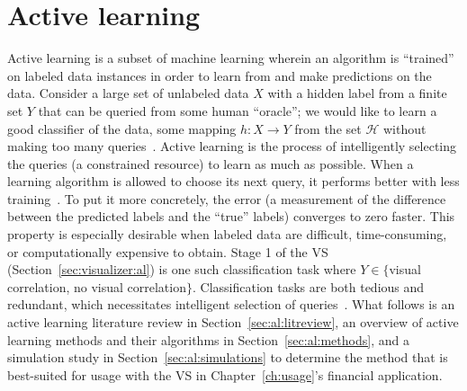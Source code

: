\chapter{Active learning \label{ch:al}}

Active learning is a subset of machine learning wherein an algorithm is 
``trained'' on labeled data instances in order to learn from and make 
predictions on the data.  Consider a large set of unlabeled data $X$ with a 
hidden label from a finite set $Y$ that can be queried from some human 
``oracle''; we would like to learn a good classifier of the data, some mapping 
$h: X \rightarrow Y$ from the set $\mathcal{H}$ without making too many 
queries~\cite{dasgupta2011}. Active learning is the process of intelligently 
selecting the queries (a constrained resource) to learn as much as possible. 
When a learning algorithm is allowed to choose its next query, it performs 
better with less training~\cite{settles2010}. To put it more concretely, the 
error (a measurement of the difference between the predicted labels and the 
``true'' labels) converges to zero faster. This property is especially 
desirable when labeled data are difficult, time-consuming, or computationally 
expensive to obtain. Stage 1 of the VS (Section~\ref{sec:visualizer:al}) is 
one such classification task where $Y\in\{$visual correlation, no visual 
correlation$\}$. 
Classification tasks are both tedious and redundant, which 
necessitates intelligent selection of queries~\cite{settles2010}. What follows 
is an active learning literature review in Section~\ref{sec:al:litreview}, an 
overview of active learning methods and their algorithms in 
Section~\ref{sec:al:methods}, and a simulation study in 
Section~\ref{sec:al:simulations} to determine the method that is best-suited 
for usage with the VS in Chapter~\ref{ch:usage}'s financial application.





%
%
